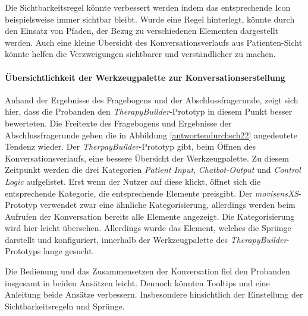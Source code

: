 Die Sichtbarkeitsregel könnte verbessert werden indem das entsprechende Icon beispielsweise immer sichtbar bleibt. Wurde eine Regel hinterlegt, könnte durch den Einsatz von Pfaden, der Bezug zu verschiedenen Elementen dargestellt werden. Auch eine kleine Übersicht des Konversationsverlaufs aus Patienten-Sicht könnte helfen die Verzweigungen sichtbarer und verständlicher zu machen.

\paragraph{Übersichtlichkeit der Werkzeugpalette zur Konversationserstellung}
Anhand der Ergebnisse des Fragebogens und der Abschlussfragerunde, zeigt sich hier, dass die Probanden den \emph{TherapyBuilder}-Prototyp in diesem Punkt besser bewerteten. Die Freitexte des Fragebogens und Ergebnisse der Abschlussfragerunde geben die in Abbildung \ref{antwortendurchsch22} angedeutete Tendenz wieder. Der \emph{TherpayBuilder}-Prototyp gibt, beim  Öffnen des Konversationsverlaufs, eine bessere Übersicht der Werkzeugpalette. Zu diesem Zeitpunkt werden die drei Kategorien \emph{Patient Input}, \emph{Chatbot-Output} und \emph{Control Logic} aufgelistet. Erst wenn der Nutzer auf diese klickt, öffnet sich die entsprechende Kategorie, die entsprechende Elemente preisgibt. Der \emph{movisensXS}-Prototyp verwendet zwar eine ähnliche Kategorisierung, allerdings werden beim Aufrufen der Konversation bereits alle Elemente angezeigt. Die Kategorisierung wird hier leicht übersehen. Allerdings wurde das Element, welches die Sprünge darstellt und konfiguriert, innerhalb der Werkzeugpalette des \emph{TherapyBuilder}-Prototyps lange gesucht. 

Die Bedienung und das Zusammensetzen der Konversation fiel den Probanden insgesamt in beiden Ansätzen leicht. Dennoch könnten Tooltips und eine Anleitung beide Ansätze verbessern. Insbesondere hinsichtlich der Einstellung der Sichtbarkeitsregeln und Sprünge. 

